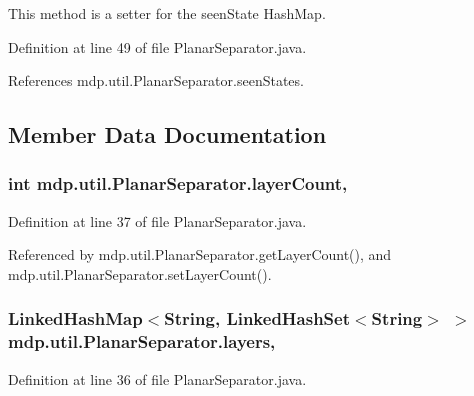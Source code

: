 This method is a setter for the seen\+State Hash\+Map. 



Definition at line 49 of file Planar\+Separator.\+java.



References mdp.\+util.\+Planar\+Separator.\+seen\+States.



\subsection{Member Data Documentation}
\hypertarget{classmdp_1_1util_1_1_planar_separator_ab298670f31704f618108ae05b782bdb9}{}
\subsubsection[{layer\+Count}]{\setlength{\rightskip}{0pt plus 5cm}int mdp.\+util.\+Planar\+Separator.\+layer\+Count\hspace{0.3cm}{\ttfamily [static]}, {\ttfamily [private]}}\label{classmdp_1_1util_1_1_planar_separator_ab298670f31704f618108ae05b782bdb9}


Definition at line 37 of file Planar\+Separator.\+java.



Referenced by mdp.\+util.\+Planar\+Separator.\+get\+Layer\+Count(), and mdp.\+util.\+Planar\+Separator.\+set\+Layer\+Count().

\hypertarget{classmdp_1_1util_1_1_planar_separator_acb79e999c0d8e484b52978cd3225420e}{}
\subsubsection[{layers}]{\setlength{\rightskip}{0pt plus 5cm}Linked\+Hash\+Map$<$String, Linked\+Hash\+Set$<$String$>$ $>$ mdp.\+util.\+Planar\+Separator.\+layers\hspace{0.3cm}{\ttfamily [static]}, {\ttfamily [private]}}\label{classmdp_1_1util_1_1_planar_separator_acb79e999c0d8e484b52978cd3225420e}


Definition at line 36 of file Planar\+Separator.\+java.



